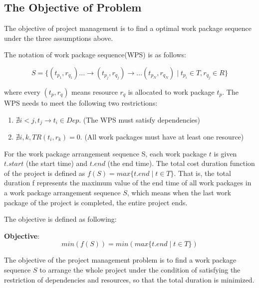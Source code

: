 \subsection{The Objective of Problem}
%
The objective of project management is to find a optimal work package sequence
under the three assumptions above.

The notation of work package sequence(WPS) is as follows:

\begin{equation}
  S = \{
  (t_{p_1}, r_{q_1}) ... \rightarrow (t_{p_j}, r_{q_j}) \rightarrow ... (t_{p_N}, r_{q_N})
  \mid t_{p_i} \in T, r_{q_j} \in R
  \}
  \label{wps}
\end{equation}

where every $(t_p, r_q)$ means resource $r_q$ is allocated to work package $t_p$.
The WPS needs to meet the following two restrictions:

\begin{enumerate}
\item $\nexists i < j, t_j \rightarrow t_i \in Dep$.
  (The WPS must satisfy dependencies)
\item $\nexists i, k, TR(t_i, r_k) = 0$.
  (All work packages must have at least one resource)
\end{enumerate}

For the work package arrangement sequence S, each work package $t$ is given
$t.start$ (the start time) and $t.end$ (the end time).  The total cost duration
function of the project is defined as $f(S) = max\{t.end \mid t \in T\}$. That
is, the total duration f represents the maximum value of the end time of all
work packages in a work package arrangement sequence $S$, which means when the
last work package of the project is completed, the entire project ends.

The objective is defined as following:

\textbf{Objective}:
\begin{equation}
  min(f(S)) = min(max\{t.end \mid t \in T\})
\end{equation}


The objective of the project management problem is to find a work
package sequence $S$ to arrange the whole project under the condition
of satisfying the restriction of dependencies and resources, so that
the total duration is minimized.


